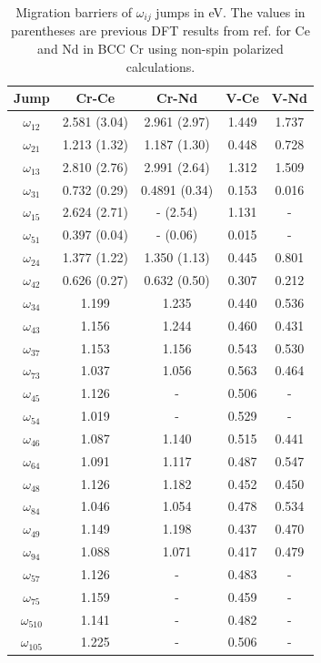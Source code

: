 \documentclass[preprint,12pt]{elsarticle}
\begin{document}
\begin{table}[]
    \centering
    \caption{Migration barriers of $\omega_{ij}$ jumps in eV. The values in parentheses are previous DFT results from ref. \cite{yang_significant_2023} for Ce and Nd in BCC Cr using non-spin polarized calculations.}
    \begin{tabular}{|c|c|c|c|c|}
    \hline
      Jump &Cr-Ce &Cr-Nd &V-Ce  &V-Nd  \\
      \hline
       $\omega_{12}$  &2.581 (3.04) &2.961 (2.97)&1.449 &1.737 \\
       $\omega_{21}$  &1.213 (1.32) &1.187 (1.30) &0.448 &0.728 \\
       \hline
       $\omega_{13}$  &2.810 (2.76) &2.991 (2.64)&1.312 &1.509 \\
       $\omega_{31}$  &0.732 (0.29) &0.4891 (0.34)&0.153 &0.016 \\
       \hline
       $\omega_{15}$  &2.624 (2.71)&-  (2.54)&1.131 &- \\ 
       $\omega_{51}$  &0.397 (0.04)&-  (0.06)&0.015 &- \\
       \hline
       $\omega_{24}$  &1.377 (1.22)&1.350 (1.13)&0.445 &0.801 \\ 
       $\omega_{42}$  &0.626 (0.27)&0.632 (0.50)&0.307 &0.212 \\
       \hline
       $\omega_{34}$  &1.199 &1.235 &0.440 &0.536 \\ 
       $\omega_{43}$  &1.156 &1.244 &0.460 &0.431 \\
       \hline
       $\omega_{37}$ &1.153 &1.156 &0.543 &0.530 \\ 
       $\omega_{73}$  &1.037 &1.056 &0.563 &0.464 \\
       \hline
       $\omega_{45}$ &1.126 &- &0.506 &- \\ 
       $\omega_{54}$ &1.019 &- &0.529 &- \\
       \hline
       $\omega_{46}$ &1.087 &1.140 &0.515 &0.441 \\ 
       $\omega_{64}$ &1.091 &1.117 &0.487 &0.547 \\
       \hline
       $\omega_{48}$ &1.126 &1.182 &0.452 &0.450 \\ 
       $\omega_{84}$  &1.046 &1.054 &0.478 &0.534 \\
       \hline
       $\omega_{49}$ &1.149 &1.198 &0.437 &0.470 \\ 
       $\omega_{94}$  &1.088 &1.071 &0.417 &0.479 \\
       \hline
       $\omega_{57}$ &1.126 &- &0.483 &- \\ 
       $\omega_{75}$  &1.159 &- &0.459 &- \\
       \hline
       $\omega_{510}$ &1.141 &- &0.482 &- \\ 
       $\omega_{105}$  &1.225 &- &0.506 &- \\
       \hline
    \end{tabular}
    \label{tab:migration_barriers_cr_v}
\end{table}

\FloatBarrier

 

\end{document}
